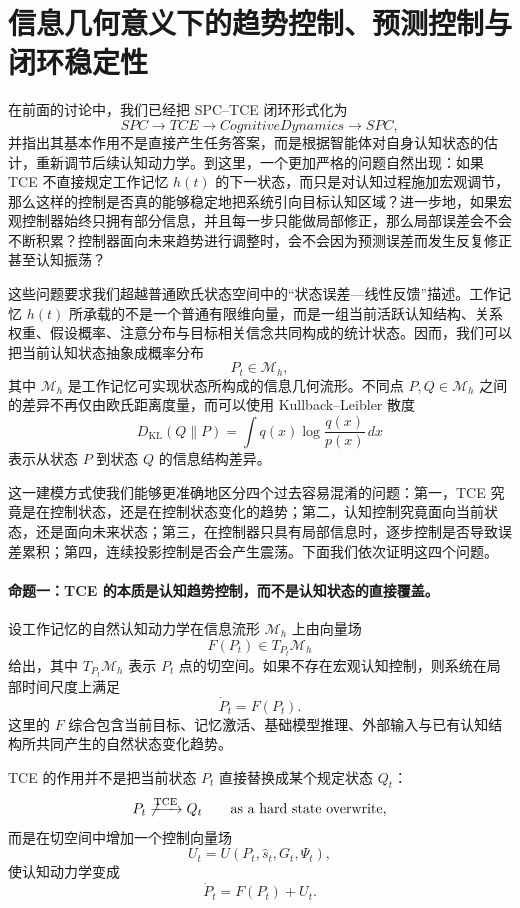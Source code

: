 \section{信息几何意义下的趋势控制、预测控制与闭环稳定性}
\label{sec:spc-tce-information-geometric-stability}

在前面的讨论中，我们已经把 SPC--TCE 闭环形式化为
\[
SPC
\rightarrow
TCE
\rightarrow
CognitiveDynamics
\rightarrow
SPC,
\]
并指出其基本作用不是直接产生任务答案，而是根据智能体对自身认知状态的估计，重新调节后续认知动力学。到这里，一个更加严格的问题自然出现：如果 TCE 不直接规定工作记忆 $h(t)$ 的下一状态，而只是对认知过程施加宏观调节，那么这样的控制是否真的能够稳定地把系统引向目标认知区域？进一步地，如果宏观控制器始终只拥有部分信息，并且每一步只能做局部修正，那么局部误差会不会不断积累？控制器面向未来趋势进行调整时，会不会因为预测误差而发生反复修正甚至认知振荡？

这些问题要求我们超越普通欧氏状态空间中的``状态误差---线性反馈''描述。工作记忆 $h(t)$ 所承载的不是一个普通有限维向量，而是一组当前活跃认知结构、关系权重、假设概率、注意分布与目标相关信念共同构成的统计状态。因而，我们可以把当前认知状态抽象成概率分布
\[
P_t\in\mathcal{M}_{h},
\]
其中 $\mathcal{M}_{h}$ 是工作记忆可实现状态所构成的信息几何流形。不同点 $P,Q\in\mathcal{M}_{h}$ 之间的差异不再仅由欧氏距离度量，而可以使用 Kullback--Leibler 散度
\[
D_{\mathrm{KL}}(Q\|P)
=
\int
q(x)
\log
\frac{q(x)}{p(x)}
\,dx
\]
表示从状态 $P$ 到状态 $Q$ 的信息结构差异。

这一建模方式使我们能够更准确地区分四个过去容易混淆的问题：第一，TCE 究竟是在控制状态，还是在控制状态变化的趋势；第二，认知控制究竟面向当前状态，还是面向未来状态；第三，在控制器只具有局部信息时，逐步控制是否导致误差累积；第四，连续投影控制是否会产生震荡。下面我们依次证明这四个问题。

\paragraph{命题一：TCE 的本质是认知趋势控制，而不是认知状态的直接覆盖。}

设工作记忆的自然认知动力学在信息流形 $\mathcal{M}_{h}$ 上由向量场
\[
F(P_t)
\in
T_{P_t}\mathcal{M}_{h}
\]
给出，其中 $T_{P_t}\mathcal{M}_{h}$ 表示 $P_t$ 点的切空间。如果不存在宏观认知控制，则系统在局部时间尺度上满足
\[
\dot P_t
=
F(P_t).
\]
这里的 $F$ 综合包含当前目标、记忆激活、基础模型推理、外部输入与已有认知结构所共同产生的自然状态变化趋势。

TCE 的作用并不是把当前状态 $P_t$ 直接替换成某个规定状态 $Q_t$：
\[
P_t
\not\xrightarrow{\mathrm{TCE}}
Q_t
\qquad
\text{as a hard state overwrite},
\]
而是在切空间中增加一个控制向量场
\[
U_t
=
U(P_t,\hat{s}_t,G_t,\Psi_t),
\]
使认知动力学变成
\[
\dot P_t
=
F(P_t)+U_t.
\label{eq:information-geometric-controlled-flow}
\]

